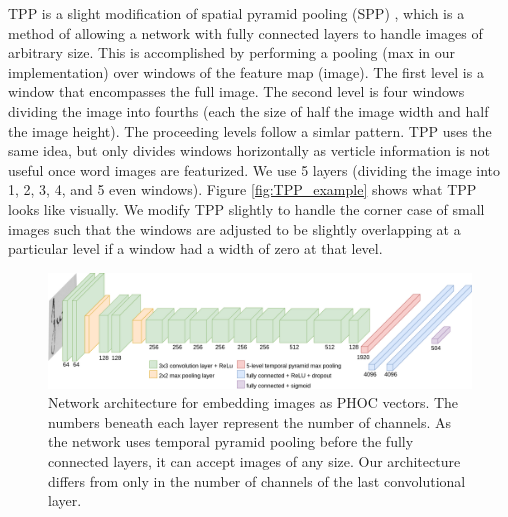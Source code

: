 \documentclass[ms,electronic,twosidetoc,letterpaper,chaptercenter,parttop,lof,lot]{byumsphd}
\begin{document}
TPP is a slight modification of spatial pyramid pooling (SPP) \cite{SPP}, which is a method of allowing a network with fully connected layers to handle images of arbitrary size. This is accomplished by performing a pooling (max in our implementation) over windows of the feature map (image). The first level is a window that encompasses the full image. The second level is four windows dividing the image into fourths (each the size of half the image width and half the image height). The proceeding levels follow a simlar pattern. TPP uses the same idea, but only divides windows horizontally as verticle information is not useful once word images are featurized. We use 5 layers (dividing the image into 1, 2, 3, 4, and 5 even windows). Figure \ref{fig:TPP_example} shows what TPP looks like visually. %
We modify TPP slightly to handle the corner case of small images such that the windows are adjusted to be slightly overlapping at a particular level if a window had a width of zero at that level.


\begin{figure}[t]
    \centering
    \includegraphics[width=.98\textwidth]{thesis-phocnet}
    \caption{Network architecture for embedding images as PHOC vectors. The numbers beneath each layer represent the number of channels. As the network uses temporal pyramid pooling before the fully connected layers, it can accept images of any size. Our architecture differs from \cite{sudholt2017} only in the number of channels of the last convolutional layer.}
    \label{fig:network}
\end{figure}
\end{document}
